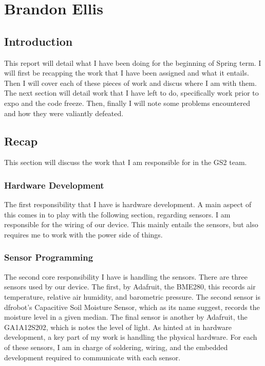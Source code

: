 \documentclass[IEEEtran,letterpaper,10pt,titlepage,fleqn,draftclsnofoot,onecolumn]{article}
\begin{document}
\section{Brandon Ellis}

\subsection{Introduction}

This report will detail what I have been doing for the beginning of Spring term. I will first be recapping the work that I have been assigned and what it entails. Then I will cover each of these pieces of work and discus where I am with them. The next section will detail work that I have left to do, specifically work prior to expo and the code freeze. Then, finally I will note some problems encountered and how they were valiantly defeated.

\subsection{Recap}

This section will discuss the work that I am responsible for in the GS2 team.

\subsubsection{Hardware Development}

The first responsibility that I have is hardware development. A main aspect of this comes in to play with the following section, regarding sensors. I am responsible for the wiring of our device. This mainly entails the sensors, but also requires me to work with the power side of things.

\subsubsection{Sensor Programming}

The second core responsibility I have is handling the sensors. There are three sensors used by our device. The first, by Adafruit, the BME280, this records air temperature, relative air humidity, and barometric pressure. The second sensor is dfrobot’s Capacitive Soil Moisture Sensor, which as its name suggest, records the moisture level in a given median. The final sensor is another by Adafruit, the GA1A12S202, which is notes the level of light. As hinted at in hardware development, a key part of my work is handling the physical hardware. For each of these sensors, I am in charge of soldering, wiring, and the embedded development required to communicate with each sensor.
\end{document}

